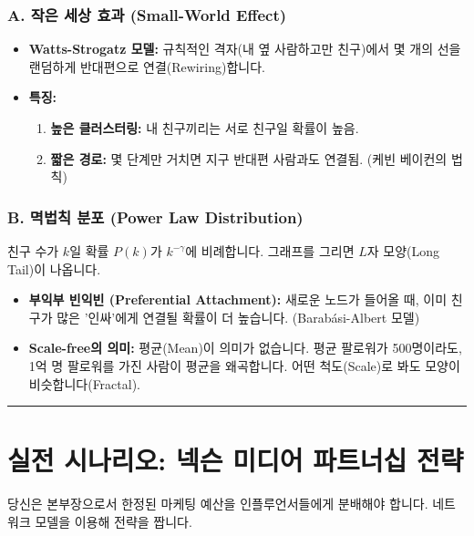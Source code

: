 \documentclass[11pt,a4paper]{book}
\theoremstyle{definition}
\begin{document}
\subsubsection*{A. 작은 세상 효과 (Small-World Effect)}

\begin{itemize}
    \item \textbf{Watts-Strogatz 모델:} 규칙적인 격자(내 옆 사람하고만 친구)에서 몇 개의 선을 랜덤하게 반대편으로 연결(Rewiring)합니다.
    \item \textbf{특징:}
    \begin{enumerate}
        \item \textbf{높은 클러스터링:} 내 친구끼리는 서로 친구일 확률이 높음.
        \item \textbf{짧은 경로:} 몇 단계만 거치면 지구 반대편 사람과도 연결됨. (케빈 베이컨의 법칙)
    \end{enumerate}
\end{itemize}

\subsubsection*{B. 멱법칙 분포 (Power Law Distribution)}

\begin{conceptbox}[title={핵심: 척도 없는 네트워크 (Scale-free)}]
친구 수가 $k$일 확률 $P(k)$가 $k^{-\gamma}$에 비례합니다.
그래프를 그리면 $L$자 모양(Long Tail)이 나옵니다.
\end{conceptbox}
\begin{itemize}
    \item \textbf{부익부 빈익빈 (Preferential Attachment):} 새로운 노드가 들어올 때, 이미 친구가 많은 '인싸'에게 연결될 확률이 더 높습니다. (Barabási-Albert 모델)
    \item \textbf{Scale-free의 의미:} 평균(Mean)이 의미가 없습니다. 평균 팔로워가 500명이라도, 1억 명 팔로워를 가진 사람이 평균을 왜곡합니다. 어떤 척도(Scale)로 봐도 모양이 비슷합니다(Fractal).
\end{itemize}

\vspace{0.5cm}\hrule\vspace{0.5cm}

\section{실전 시나리오: 넥슨 미디어 파트너십 전략}

\begin{storybox}[title={Scenario: 신작 게임 마케팅 예산 분배}]
당신은 본부장으로서 한정된 마케팅 예산을 인플루언서들에게 분배해야 합니다. 네트워크 모델을 이용해 전략을 짭니다.
\end{storybox}
\end{document}
